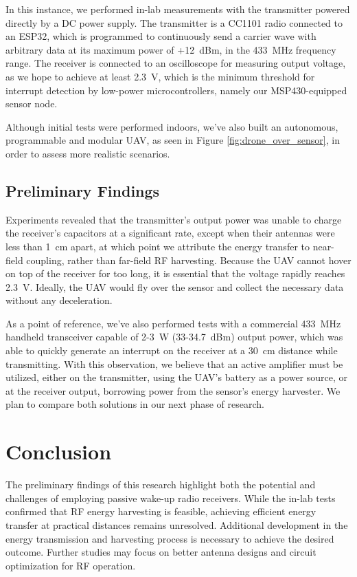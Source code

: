 \documentclass[conference]{IEEEtran}
\begin{document}
In this instance, we performed in-lab measurements with the transmitter powered directly by a DC power supply. The transmitter is a CC1101 radio connected to an ESP32, which is programmed to continuously send a carrier wave with arbitrary data at its maximum power of +12~dBm, in the 433~MHz frequency range. The receiver is connected to an oscilloscope for measuring output voltage, as we hope to achieve at least 2.3~V, which is the minimum threshold for interrupt detection by low-power microcontrollers, namely our MSP430-equipped sensor node.

Although initial tests were performed indoors, we've also built an autonomous, programmable and modular UAV, as seen in Figure \ref{fig:drone_over_sensor}, in order to assess more realistic scenarios.

\subsection{Preliminary Findings}

Experiments revealed that the transmitter's output power was unable to charge the receiver's capacitors at a significant rate, except when their antennas were less than 1~cm apart, at which point we attribute the energy transfer to near-field coupling, rather than far-field RF harvesting. Because the UAV cannot hover on top of the receiver for too long, it is essential that the voltage rapidly reaches 2.3~V. Ideally, the UAV would fly over the sensor and collect the necessary data without any deceleration.

As a point of reference, we've also performed tests with a commercial 433~MHz handheld transceiver capable of 2-3~W (33-34.7~dBm) output power, which was able to quickly generate an interrupt on the receiver at a 30~cm distance while transmitting. With this observation, we believe that an active amplifier must be utilized, either on the transmitter, using the UAV's battery as a power source, or at the receiver output, borrowing power from the sensor's energy harvester. We plan to compare both solutions in our next phase of research.

\section{Conclusion}

The preliminary findings of this research highlight both the potential and challenges of employing passive wake-up radio receivers. While the in-lab tests confirmed that RF energy harvesting is feasible, achieving efficient energy transfer at practical distances remains unresolved. Additional development in the energy transmission and harvesting process is necessary to achieve the desired outcome. Further studies may focus on better antenna designs and circuit optimization for RF operation.
\end{document}
